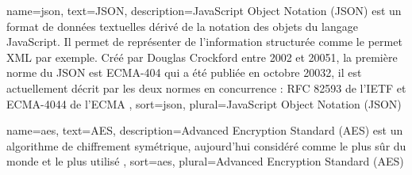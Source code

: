 {%
	name={json}, %
	text={JSON},
	description={JavaScript Object Notation (JSON) est un format de données textuelles dérivé de la notation des objets du langage JavaScript. Il permet de représenter de l’information structurée comme le permet XML par exemple. Créé par Douglas Crockford entre 2002 et 20051, la première norme du JSON est ECMA-404 qui a été publiée en octobre 20032, il est actuellement décrit par les deux normes en concurrence : RFC 82593 de l’IETF et ECMA-4044 de l'ECMA \cite{JSONWikipedia}}, %
	sort={json}, %
	plural={JavaScript Object Notation (JSON)} %
}

{
	name={aes}, %
	text={AES},
	description={Advanced Encryption Standard (AES) est un algorithme de chiffrement symétrique, aujourd'hui considéré comme le plus sûr du monde et le plus utilisé \cite{AESWikipedia}}, %
	sort={aes}, %
	plural={Advanced Encryption Standard (AES)} %
}